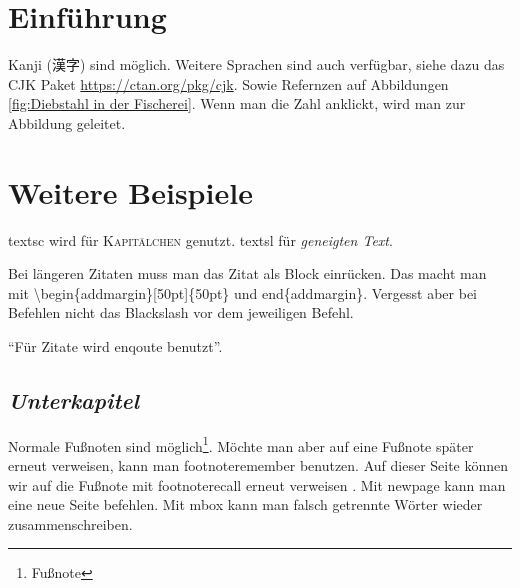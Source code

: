 \section{Einführung}

Kanji (漢字) sind möglich.
Weitere Sprachen sind auch verfügbar, siehe dazu das CJK Paket \url{https://ctan.org/pkg/cjk}.
Sowie Refernzen auf Abbildungen \ref{fig:Diebstahl in der Fischerei}. Wenn man die Zahl anklickt, wird man zur Abbildung geleitet.
\section{Weitere Beispiele}
textsc wird für \textsc{Kapitälchen} genutzt.
textsl für \textsl{geneigten Text}.
\\
\begin{addmargin}[50pt]{50pt}Bei längeren Zitaten muss man das Zitat als Block einrücken.
Das macht man mit \textbackslash begin\{addmargin\}[50pt]\{50pt\} und end\{addmargin\}.
Vergesst aber bei Befehlen nicht das Blackslash vor dem jeweiligen Befehl.\\  
\end{addmargin}

\enquote{Für Zitate wird enqoute benutzt}.

\subsection{\textsl{Unterkapitel}} 

Normale Fußnoten sind möglich\footnote{Fußnote}.
Möchte man aber auf eine Fußnote später erneut verweisen, kann man footnoteremember benutzen.
\newpage
Auf dieser Seite können wir auf die Fußnote mit footnoterecall erneut verweisen .
Mit \mbox{newpage} kann man eine neue Seite befehlen. Mit mbox kann man falsch getrennte Wörter wieder zusammenschreiben.

